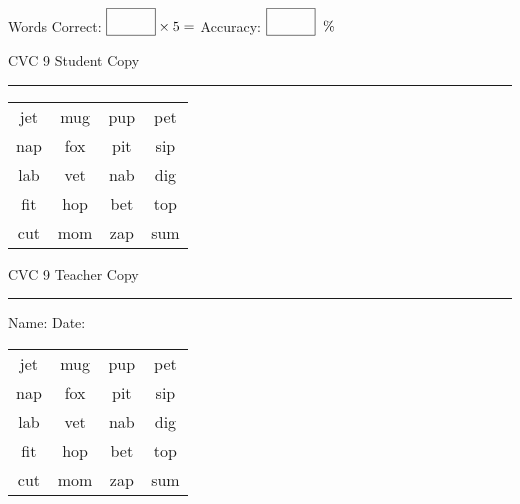 \documentclass{memoir}
\begin{document}
\normalsize

Words Correct: $\fbox{\phantom{\huge 100}} \times 5 = $ Accuracy: $\fbox{\phantom{\huge 100}}\;\; \%$ 

\vfill

\newpage


\footnotesize \noindent
CVC 9 \hfill Student Copy
\smallskip
\hrule

\huge

\setlength{\tabcolsep}{14pt}
\def\arraystretch{2}

{\selectfont


\begin{vplace}[0.5]
\begin{center}
\begin{tabular}{cccc}
jet & mug & pup & pet \\
nap & fox & pit & sip \\
lab & vet & nab & dig \\
fit & hop & bet & top \\
cut & mom & zap & sum \\
\end{tabular}
\end{center}
\end{vplace}

}

\newpage

\footnotesize \noindent
CVC 9 \hfill Teacher Copy
\smallskip
\hrule

\normalsize

\vfill

\noindent
Name: \underline{\hspace{1.75in}} \hfill Date: \underline{\hspace{1in}}

\huge

{\selectfont


\begin{vplace}[0.5]
\begin{center}
\begin{tabular}{cccc}
jet & mug & pup & pet \\
nap & fox & pit & sip \\
lab & vet & nab & dig \\
fit & hop & bet & top \\
cut & mom & zap & sum \\
\end{tabular}
\end{center}
\end{vplace}



}
\end{document}
